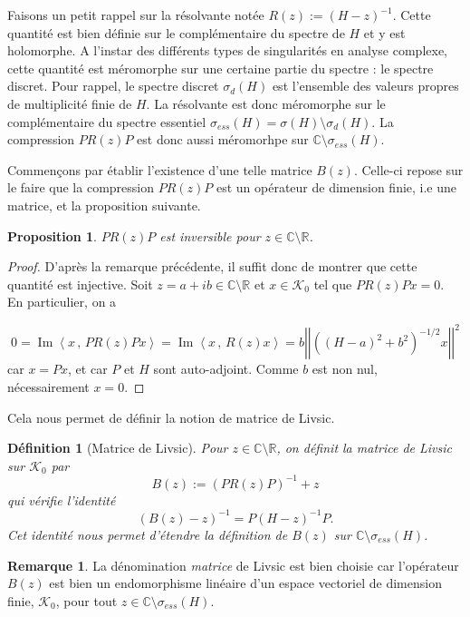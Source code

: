 \documentclass[12pt,openany,a4paper, titlepage]{article}
\newcommand{\lp}{\left(}
\newcommand{\rp}{\right)}
\newcommand{\lb}{\left|}
\newcommand{\rb}{\right|}
\newcommand{\la}{\left\langle}
\newcommand{\ra}{\right\rangle}
\newcommand{\R}{\mathbb{R}}
\newcommand{\C}{\mathbb{C}}
\newcommand{\inv}{^{-1}}
\newcommand{\im}{\operatorname{Im}}
\newtheorem{Def}{Définition}
\newtheorem{prop}{Proposition}
\theoremstyle{definition}
\theoremstyle{definition}
\theoremstyle{definition}
\theoremstyle{definition}
\theoremstyle{definition}
\newtheorem{rem}{Remarque}
\theoremstyle{definition}
\begin{document}
Faisons un petit rappel sur la résolvante notée $R(z) := (H-z)\inv$. Cette quantité est bien définie sur le complémentaire du spectre de $H$ et y est holomorphe. A l'instar des différents types de singularités en analyse complexe, cette quantité est méromorphe sur une certaine partie du spectre : le spectre discret. Pour rappel, le spectre discret $\sigma_d(H)$ est l'ensemble des valeurs propres de multiplicité finie de $H$. La résolvante est donc méromorphe sur le complémentaire du spectre essentiel $\sigma_{ess}(H) = \sigma(H)\setminus\sigma_d (H)$. La compression $PR(z)P$ est donc aussi méromorhpe sur  $\C\setminus\sigma_{ess}(H)$.

Commençons par établir l'existence d'une telle matrice $B(z)$. Celle-ci repose sur le faire que la compression $PR(z)P$ est un opérateur de dimension finie, i.e une matrice, et la proposition suivante.

\begin{prop}
    $PR(z)P$ est inversible pour $z\in\C\setminus\R$.
\end{prop}
\begin{proof}
    D'après la remarque précédente, il suffit donc de montrer que cette quantité est injective. Soit $z = a+ib\in\C\setminus\R$ et $x\in \mathcal{K}_0$ tel que $PR(z)Px = 0$. En particulier, on a 

    $$0 = \im\la x\,,\, PR(z)Px \ra = \im\la x\,,\, R(z)x \ra = b\lb\lb\lp (H-a)^2 + b^2 \rp^{-1/2}x\rb\rb^2$$
    car $x = Px$, et car $P$ et $H$ sont auto-adjoint. Comme $b$ est non nul, nécessairement $x = 0$.
\end{proof}

Cela nous permet de définir la notion de matrice de Livsic.

\begin{Def}[Matrice de Livsic]
Pour $z\in \C\setminus\R$, on définit la matrice de Livsic sur $\mathcal{K}_0$ par
\begin{equation*}
    B(z) := (PR(z)P)\inv + z
\end{equation*}
qui vérifie l'identité 
\begin{equation*}
    (B(z)-z)\inv = P(H-z)\inv P.
\end{equation*}
Cet identité nous permet d'étendre la définition de $B(z)$ sur $\C\setminus\sigma_{ess}(H)$.
\end{Def}

\begin{rem}
    La dénomination \textit{matrice} de Livsic est bien choisie car l'opérateur $B(z)$ est bien un endomorphisme linéaire d'un espace vectoriel de dimension finie, $\mathcal{K}_0$, pour tout $z\in\C\setminus\sigma_{ess}(H)$.
\end{rem}
\end{document}

